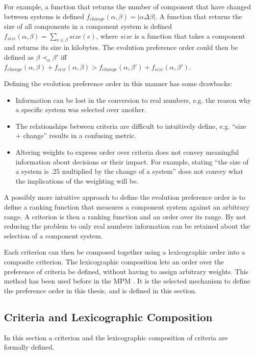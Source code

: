 For example, a function that returns the number of component that have changed between systems is defined $f_{change}(\alpha,\beta) = |\alpha \Delta \beta|$.
A function that returns the size of all components in a component system is defined $f_{size}(\alpha,\beta) = \sum \limits_{c \in \beta} size(c)$,
 where $size$ is a function that takes a component and returns its size in kilobytes.
The evolution preference order could then be defined as $\beta \prec_{\alpha} \beta'$ iff $f_{change}(\alpha,\beta) + f_{size}(\alpha,\beta) > f_{change}(\alpha,\beta') + f_{size}(\alpha,\beta')$.

Defining the evolution preference order in this manner has some drawbacks:
\begin{itemize}
  \item Information can be lost in the conversion to real numbers, e.g. the reason why a specific system was selected over another.
  \item The relationships between criteria are difficult to intuitively define, e.g. ``size $+$ change'' results in a confusing metric.
  \item Altering weights to express order over criteria does not convey meaningful information about decisions or their impact.
  For example, stating ``the size of a system is $.25$ multiplied by the change of a system'' does not convey what the implications of the weighting will be.
\end{itemize}

A possibly more intuitive approach to define the evolution preference order is to define a ranking function that measures a component system against an arbitrary range.
A criterion is then a ranking function and an order over its range. 
By not reducing the problem to only real numbers information can be retained about the selection of a component system.

Each criterion can then be composed together using a lexicographic order into a composite criterion.
The lexicographic composition lets an order over the preference of criteria be defined, without having to assign arbitrary weights.
This method has been used before in the MPM \citep{abate2011}.
It is the selected mechanism to define the preference order in this thesis, and is defined in this section.

\subsection{Criteria and Lexicographic Composition}
In this section a criterion and the lexicographic composition of criteria are formally defined.

